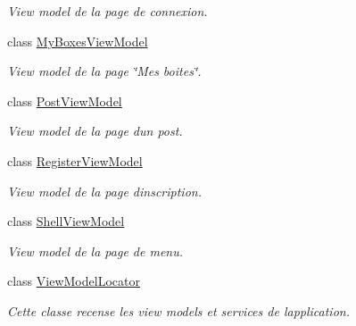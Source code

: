 \begin{DoxyCompactItemize}
\begin{DoxyCompactList}\small\item\em View model de la page de connexion. \end{DoxyCompactList}\item 
class \hyperlink{class_boxes_1_1_view_models_1_1_my_boxes_view_model}{My\+Boxes\+View\+Model}
\begin{DoxyCompactList}\small\item\em View model de la page \char`\"{}\+Mes boites\char`\"{}. \end{DoxyCompactList}\item 
class \hyperlink{class_boxes_1_1_view_models_1_1_post_view_model}{Post\+View\+Model}
\begin{DoxyCompactList}\small\item\em View model de la page d\textquotesingle{}un post. \end{DoxyCompactList}\item 
class \hyperlink{class_boxes_1_1_view_models_1_1_register_view_model}{Register\+View\+Model}
\begin{DoxyCompactList}\small\item\em View model de la page d\textquotesingle{}inscription. \end{DoxyCompactList}\item 
class \hyperlink{class_boxes_1_1_view_models_1_1_shell_view_model}{Shell\+View\+Model}
\begin{DoxyCompactList}\small\item\em View model de la page de menu. \end{DoxyCompactList}\item 
class \hyperlink{class_boxes_1_1_view_models_1_1_view_model_locator}{View\+Model\+Locator}
\begin{DoxyCompactList}\small\item\em Cette classe recense les view models et services de l\textquotesingle{}application. \end{DoxyCompactList}\end{DoxyCompactItemize}
